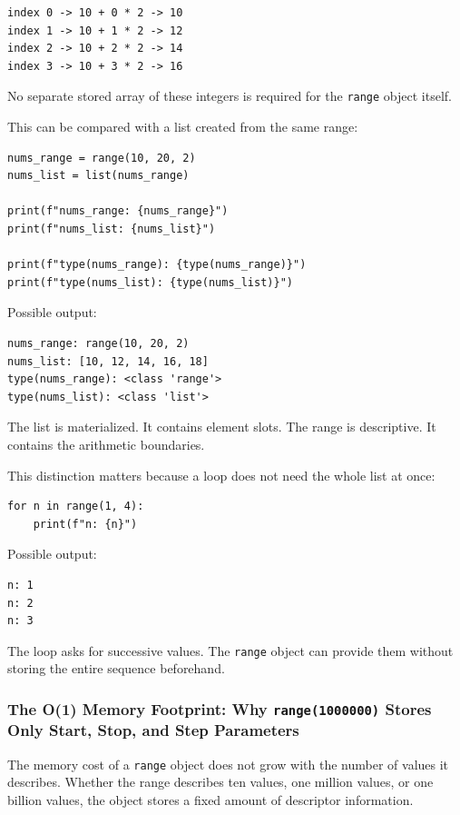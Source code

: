 \begin{verbatim}
index 0 -> 10 + 0 * 2 -> 10
index 1 -> 10 + 1 * 2 -> 12
index 2 -> 10 + 2 * 2 -> 14
index 3 -> 10 + 3 * 2 -> 16
\end{verbatim}

No separate stored array of these integers is required for the \texttt{range} object itself.

This can be compared with a list created from the same range:

\begin{verbatim}
nums_range = range(10, 20, 2)
nums_list = list(nums_range)

print(f"nums_range: {nums_range}")
print(f"nums_list: {nums_list}")

print(f"type(nums_range): {type(nums_range)}")
print(f"type(nums_list): {type(nums_list)}")
\end{verbatim}

Possible output:

\begin{verbatim}
nums_range: range(10, 20, 2)
nums_list: [10, 12, 14, 16, 18]
type(nums_range): <class 'range'>
type(nums_list): <class 'list'>
\end{verbatim}

The list is materialized. It contains element slots. The range is descriptive. It contains the arithmetic boundaries.

This distinction matters because a loop does not need the whole list at once:

\begin{verbatim}
for n in range(1, 4):
    print(f"n: {n}")
\end{verbatim}

Possible output:

\begin{verbatim}
n: 1
n: 2
n: 3
\end{verbatim}

The loop asks for successive values. The \texttt{range} object can provide them without storing the entire sequence beforehand.

\subsubsection{The O(1) Memory Footprint: Why \texttt{range(1000000)} Stores Only Start, Stop, and Step Parameters}

The memory cost of a \texttt{range} object does not grow with the number of values it describes. Whether the range describes ten values, one million values, or one billion values, the object stores a fixed amount of descriptor information.

